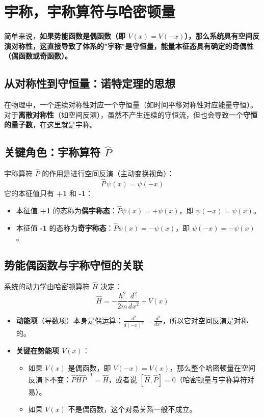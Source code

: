 \section{宇称，宇称算符与哈密顿量}
简单来说，\textbf{如果势能函数是偶函数（即 $ V(x) = V(-x) $），那么系统具有空间反演对称性，这直接导致了体系的"宇称"是守恒量，能量本征态具有确定的奇偶性（偶函数或奇函数）。}

\subsection{从对称性到守恒量：诺特定理的思想}
在物理中，一个连续对称性对应一个守恒量（如时间平移对称性对应能量守恒）。对于\textbf{离散对称性}（如空间反演），虽然不产生连续的守恒流，但也会导致一个\textbf{守恒的量子数}，在这里就是宇称。

\subsection{关键角色：宇称算符 $ \hat{P} $}
宇称算符 $ \hat{P} $ 的作用是进行空间反演（主动变换视角）：
\[
\hat{P} \, \psi(x) = \psi(-x)
\]
它的本征值只有 \textbf{+1} 和 \textbf{-1}：
\begin{itemize}
	\item 本征值 \textbf{+1} 的态称为\textbf{偶宇称态}：$ \hat{P}\psi(x) = +\psi(x) $，即 $ \psi(-x) = \psi(x) $。
	\item 本征值 \textbf{-1} 的态称为\textbf{奇宇称态}：$ \hat{P}\psi(x) = -\psi(x) $，即 $ \psi(-x) = -\psi(x) $。
\end{itemize}

\subsection{势能偶函数与宇称守恒的关联}
系统的动力学由哈密顿算符 $ \hat{H} $ 决定：
\[
\hat{H} = -\frac{\hbar^2}{2m} \frac{d^2}{dx^2} + V(x)
\]

\begin{itemize}
	\item \textbf{动能项}（导数项）本身是偶运算：$ \frac{d^2}{d(-x)^2} = \frac{d^2}{dx^2} $，所以它对空间反演是对称的。
	\item \textbf{关键在势能项 $ V(x) $}：
	\begin{itemize}
		\item 如果 $ V(x) $ 是偶函数，即 $ V(-x) = V(x) $，那么整个哈密顿量在空间反演下不变：$ \hat{P} \hat{H} \hat{P}^{-1} = \hat{H} $，或者说 $ [\hat{H}, \hat{P}] = 0 $（哈密顿量与宇称算符对易）。
		\item 如果 $ V(x) $ 不是偶函数，这个对易关系一般不成立。
	\end{itemize}
\end{itemize}

